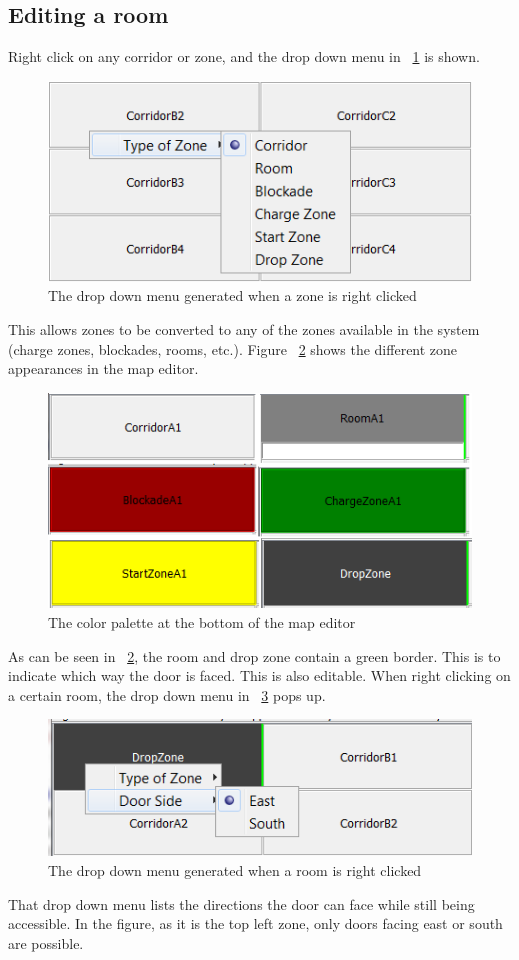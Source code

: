 \subsection{Editing a room}
Right click on any corridor or zone, and the drop down menu in ~\ref{fig:dropMenu} is shown.
\begin{figure}[h]
	\includegraphics[scale=0.55]{NewFeatures/DropDownMenuRoom.png}
\caption{The drop down menu generated when a zone is right clicked}
\label{fig:dropMenu}
\end{figure}
This allows zones to be converted to any of the zones available in the system (charge zones, blockades, rooms, etc.). Figure ~\ref{fig:rooms} shows the different zone appearances in the map editor.
\begin{figure}[h]
	\includegraphics{NewFeatures/DifferentRooms.png}
\caption{The color palette at the bottom of the map editor}
\label{fig:rooms}
\end{figure}
As can be seen in ~\ref{fig:rooms}, the room and drop zone contain a green border. This is to indicate which way the door is faced. This is also editable. When right clicking on a certain room, the drop down menu in ~\ref{fig:menuroom} pops up.
\begin{figure}[h]
	\includegraphics{NewFeatures/DropDownMenuRoom2.png}
\caption{The drop down menu generated when a room is right clicked}
\label{fig:menuroom}
\end{figure}
That drop down menu lists the directions the door can face while still being accessible. In the figure, as it is the top left zone, only doors facing east or south are possible.
